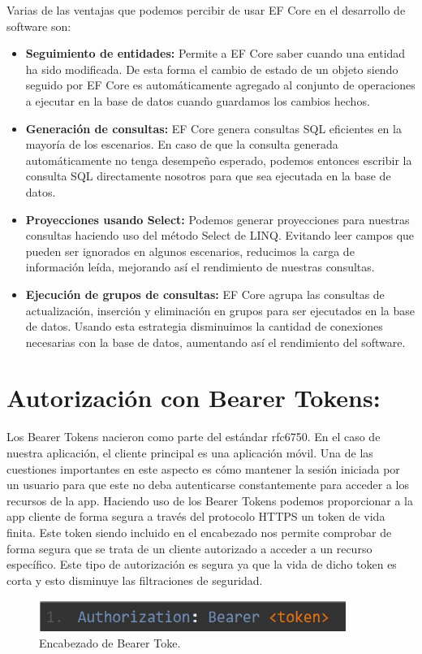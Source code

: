 Varias de las ventajas que podemos percibir de usar EF Core en el desarrollo de software son:

\begin{itemize}
	\item \textbf{Seguimiento de entidades:} Permite a EF Core saber cuando una entidad ha sido modificada. De esta forma el cambio de estado de un objeto siendo seguido por EF Core es automáticamente agregado al conjunto de operaciones a ejecutar en la base de datos cuando guardamos los cambios hechos.
    \item \textbf{Generación de consultas:} EF Core genera consultas SQL eficientes en la mayoría de los escenarios. En caso de que la consulta generada automáticamente no tenga desempeño esperado, podemos entonces escribir la consulta SQL directamente nosotros para que sea ejecutada en la base de datos.
    \item \textbf{Proyecciones usando Select:} Podemos generar proyecciones para nuestras consultas haciendo uso del método Select de LINQ. Evitando leer campos que pueden ser ignorados en algunos escenarios, reducimos la carga de información leída, mejorando así el rendimiento de nuestras consultas.
    \item \textbf{Ejecución de grupos de consultas:} EF Core agrupa las consultas de actualización, inserción y eliminación en grupos para ser ejecutados en la base de datos. Usando esta estrategia disminuimos la cantidad de conexiones necesarias con la base de datos, aumentando así el rendimiento del software.
    
\end{itemize}

\section{Autorización con Bearer Tokens:}
Los Bearer Tokens nacieron como parte del estándar rfc6750.  En el caso de nuestra aplicación, el cliente principal es una aplicación móvil. Una de las cuestiones importantes en este aspecto es cómo mantener la sesión iniciada por un usuario para que este no deba autenticarse constantemente para acceder a los recursos de la app. Haciendo uso de los Bearer Tokens podemos proporcionar a la app cliente de forma segura a través del protocolo HTTPS un token de vida finita. Este token siendo incluido en el encabezado nos permite comprobar de forma segura que se trata de un cliente autorizado a acceder a un recurso específico. Este tipo de autorización es segura ya que la vida de dicho token es corta y esto disminuye las filtraciones de seguridad.
\begin{figure}[H]
	\centering
	\includegraphics[width = 10cm]{Graphics/bearer_token.jpg}
	\caption{Encabezado de Bearer Toke. }
	\label{fig:bearer_tokne}
\end{figure}

